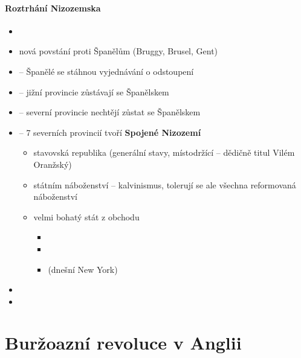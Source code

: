 \paragraph{Roztrhání Nizozemska}
\begin{itemize}
\item {}
\item nová povstání proti Španělům (Bruggy, Brusel, Gent)
\item {} -- Španělé se stáhnou \ra vyjednávání o odstoupení
\item {} -- jižní provincie zůstávají se Španělskem
\item {} -- severní provincie nechtějí zůstat se Španělskem
\item {} -- 7 severních provincií tvoří \textbf{Spojené Nizozemí}
	\begin{itemize}
	\item stavovská republika (generální stavy, místodržící -- dědičně titul Vilém Oranžský)
	\item státním náboženství -- kalvinismus, tolerují se ale všechna reformovaná náboženství
	\item velmi bohatý stát z obchodu
		\begin{itemize}
		\item {}
		\item {}
		\item {}(dnešní New York)
		\end{itemize}
	\end{itemize}
\item {}
\item {}
\end{itemize}

\section{Buržoazní revoluce v Anglii}
